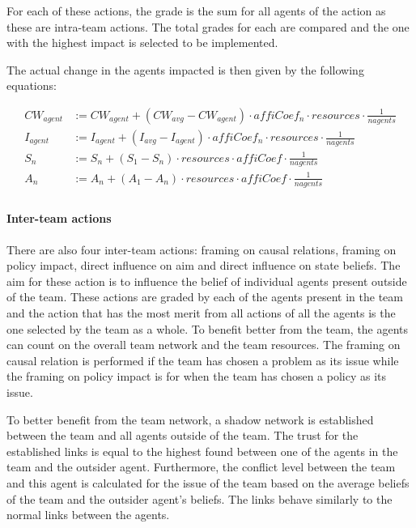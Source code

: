 For each of these actions, the grade is the sum for all agents of the action as these are intra-team actions. The total grades for each are compared and the one with the highest impact is selected to be implemented.

The actual change in the agents impacted is then given by the following equations:

\begin{equation} \begin{split}
CW_{agent} &:= CW_{agent} +  \left(CW_{avg} - CW_{agent} \right) \cdot affiCoef_n \cdot resources \cdot \frac{1}{nagents} \\
I_{agent} &:= I_{agent} +  \left(I_{avg} - I_{agent} \right) \cdot affiCoef_n \cdot resources \cdot \frac{1}{nagents} \\
S_{n} &:= S_{n} + \left(S_{1} - S_{n} \right) \cdot resources \cdot affiCoef \cdot \frac{1}{nagents} \\
A_{n} &:= A_{n} + \left(A_{1} - A_{n} \right) \cdot resources \cdot affiCoef \cdot \frac{1}{nagents} \\
\end{split}\end{equation}


\paragraph{Inter-team actions}

There are also four inter-team actions: framing on causal relations, framing on policy impact, direct influence on aim and direct influence on state beliefs. The aim for these action is to influence the belief of individual agents present outside of the team. These actions are graded by each of the agents present in the team and the action that has the most merit from all actions of all the agents is the one selected by the team as a whole. To benefit better from the team, the agents can count on the overall team network and the team resources. The framing on causal relation is performed if the team has chosen a problem as its issue while the framing on policy impact is for when the team has chosen a policy as its issue.

To better benefit from the team network, a shadow network is established between the team and all agents outside of the team. The trust for the established links is equal to the highest found between one of the agents in the team and the outsider agent. Furthermore, the conflict level between the team and this agent is calculated for the issue of the team based on the average beliefs of the team and the outsider agent's beliefs. The links behave similarly to the normal links between the agents.

